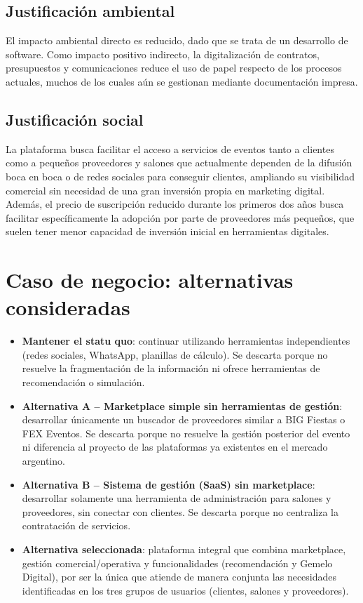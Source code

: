 \subsection{Justificación ambiental}

El impacto ambiental directo es reducido, dado que se trata de un
desarrollo de software. Como impacto positivo indirecto, la
digitalización de contratos, presupuestos y comunicaciones reduce el uso
de papel respecto de los procesos actuales, muchos de los cuales aún se
gestionan mediante documentación impresa.

\subsection{Justificación social}

La plataforma busca facilitar el acceso a servicios de eventos tanto a
clientes como a pequeños proveedores y salones que actualmente dependen
de la difusión boca en boca o de redes sociales para conseguir clientes,
ampliando su visibilidad comercial sin necesidad de una gran inversión
propia en marketing digital. Además, el precio de suscripción reducido
durante los primeros dos años busca facilitar específicamente la
adopción por parte de proveedores más pequeños, que suelen tener menor
capacidad de inversión inicial en herramientas digitales.

\section{Caso de negocio: alternativas consideradas}

\begin{itemize}
    \item \textbf{Mantener el statu quo}: continuar utilizando
          herramientas independientes (redes sociales, WhatsApp,
          planillas de cálculo). Se descarta porque no resuelve la
          fragmentación de la información ni ofrece herramientas de recomendación o simulación.
    \item \textbf{Alternativa A -- Marketplace simple sin herramientas de
          gestión}: desarrollar únicamente un buscador de proveedores
          similar a BIG Fiestas o FEX Eventos. Se descarta porque no
          resuelve la gestión posterior del evento ni diferencia al
          proyecto de las plataformas ya existentes en el mercado
          argentino.
    \item \textbf{Alternativa B -- Sistema de gestión (SaaS) sin
          marketplace}: desarrollar solamente una herramienta de
          administración para salones y proveedores, sin conectar con
          clientes. Se descarta porque no centraliza la contratación de
          servicios.
    \item \textbf{Alternativa seleccionada}: plataforma integral que
          combina marketplace, gestión comercial/operativa y
          funcionalidades (recomendación y Gemelo Digital),
          por ser la única que atiende de manera conjunta las
          necesidades identificadas en los tres grupos de usuarios
          (clientes, salones y proveedores).
\end{itemize}

